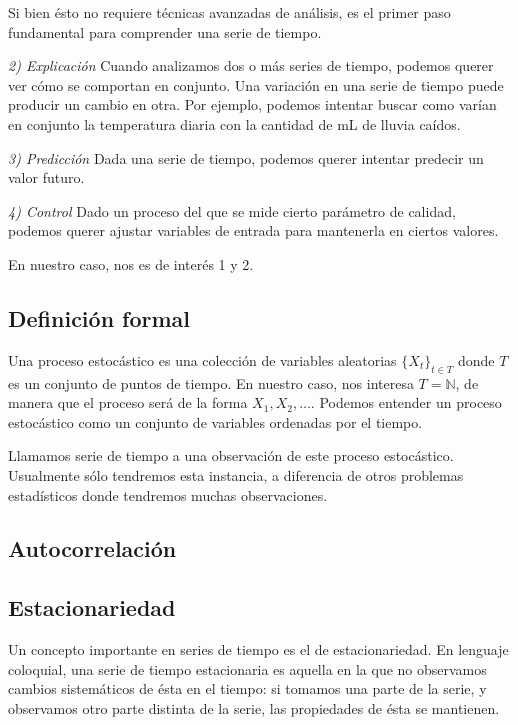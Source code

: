 Si bien ésto no requiere técnicas avanzadas de análisis, es el primer paso fundamental para comprender una serie de tiempo.


\emph{2) Explicación} Cuando analizamos dos o más series de tiempo, podemos querer ver cómo se comportan en conjunto. Una variación en una serie de tiempo puede producir un cambio en otra. Por ejemplo, podemos intentar buscar como varían en conjunto la temperatura diaria con la cantidad de mL de lluvia caídos.

\emph{3) Predicción} Dada una serie de tiempo, podemos querer intentar predecir un valor futuro.

\emph{4) Control} Dado un proceso del que se mide cierto parámetro de calidad, podemos querer ajustar variables de entrada para mantenerla en ciertos valores.

En nuestro caso, nos es de interés 1 y 2.


\subsection*{Definición formal}

Una proceso estocástico es una colección de variables aleatorias $\{X_t \}_{t \in T}$ donde $T$ es un conjunto de puntos de tiempo. En nuestro caso, nos interesa $T = \mathbb{N}$, de manera que el proceso será de la forma $X_1, X_2, \ldots $. Podemos entender un proceso estocástico como un conjunto de variables ordenadas por el tiempo.

Llamamos serie de tiempo a una observación de este proceso estocástico. Usualmente sólo tendremos esta instancia, a diferencia de otros problemas estadísticos donde tendremos muchas observaciones.

\subsection*{Autocorrelación}


\subsection{Estacionariedad}

Un concepto importante en series de tiempo es el de estacionariedad. En lenguaje coloquial, una serie de tiempo estacionaria es aquella en la que no observamos cambios sistemáticos de ésta en el tiempo: si tomamos una parte de la serie, y observamos otro parte distinta de la serie, las propiedades de ésta se mantienen.

